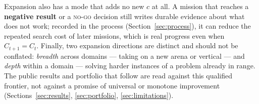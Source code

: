 Expansion also has a mode that adds no new $c$ at all. A mission that reaches a
\textbf{negative result} or a \textsc{no-go} decision still writes durable evidence
about what does not work; recorded in the process (Section~\ref{sec:process}), it can
reduce the repeated search cost of later missions, which is real progress even when
$C_{t+1}=C_t$. Finally, two expansion directions are distinct and should not be
conflated: \emph{breadth} across domains --- taking on a new arena or vertical --- and
\emph{depth} within a domain --- solving harder instances of a problem already in
range. The public results and portfolio that follow are read against this qualified
frontier, not against a promise of universal or monotone improvement
(Sections~\ref{sec:results}, \ref{sec:portfolio}, \ref{sec:limitations}).
